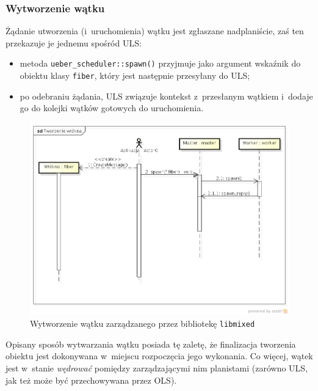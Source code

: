 \documentclass[11pt,makeidx]{mwart}
\newcommand{\code}{\texttt}
\newcommand{\dcolon}{::}
\newcommand{\procbr}{()}
\begin{document}
\subsubsection{Wytworzenie wątku}
\indent
	Żądanie utworzenia (i~uruchomienia) wątku jest zgłaszane nad\dywiz planiście, zaś ten przekazuje je jednemu spośród ULS:
	\begin{itemize}
		\item metoda \code{ueber\_scheduler\dcolon spawn\procbr} przyjmuje jako argument wskaźnik do obiektu klasy \code{fiber}, który
			jest następnie przesyłany do ULS;
		\item po odebraniu żądania, ULS związuje kontekst z~przesłanym wątkiem i~dodaje go do kolejki wątków gotowych do uruchomienia.
	\end{itemize}
	\begin{figure}[h!]
		\label{fig:threadcreation}
		\centering
		\hspace*{-1cm}\includegraphics[scale=.6]{ThreadCreation.png}
		\caption{Wytworzenie wątku zarządzanego przez bibliotekę \code{libmixed}}
	\end{figure}
	Opisany sposób wytwarzania wątku posiada tę zaletę, że finalizacja tworzenia obiektu jest dokonywana w~miejscu rozpoczęcia jego wykonania.
	Co więcej, wątek jest w~stanie \emph{wędrować} pomiędzy zarządzającymi nim planistami (zarówno ULS, jak też może być przechowywana przez
	OLS).
\par
%
\end{document}
